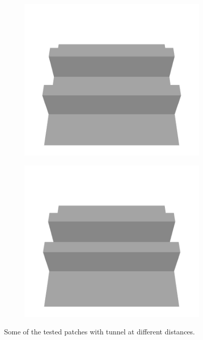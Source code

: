 \begin{figure}[H]
\begin{subfigure}[b]{0.24\textwidth}
    \includegraphics[width=\linewidth]{../img/5/custom_patches/tunnel/all/20-3d.png}
    \end{subfigure}
    \begin{subfigure}[b]{0.24\textwidth}
    \includegraphics[width=\linewidth]{../img/5/custom_patches/tunnel/all/23-3d.png}
    \end{subfigure}
    \caption{Some of the tested patches with tunnel at different distances.}
    \end{figure}

